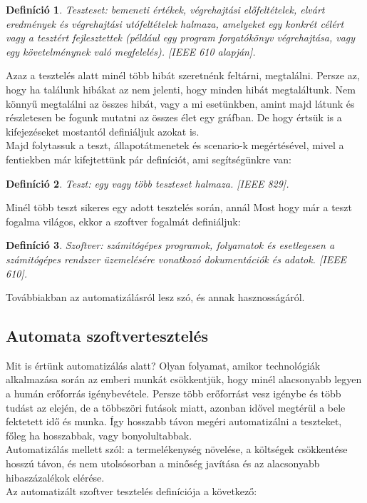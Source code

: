 \documentclass[12pt]{article}
\newtheorem{defin}{Definíció}[section]
\begin{document}
\begin{defin}
Teszteset: bemeneti értékek, végrehajtási előfeltételek, elvárt eredmények és végrehajtási utófeltételek halmaza, amelyeket egy konkrét célért vagy a tesztért fejlesztettek (például egy program forgatókönyv végrehajtása, vagy egy követelménynek való megfelelés). [IEEE 610 alapján]. ~\cite{htb:masterfield}
\end{defin}

Azaz a tesztelés alatt minél több hibát szeretnénk feltárni, megtalálni. Persze az, hogy ha találunk hibákat az nem jelenti, hogy minden hibát megtaláltunk. Nem könnyű megtalálni az összes hibát, vagy a mi esetünkben, amint majd látunk és részletesen be fogunk mutatni az összes élet egy gráfban. De hogy értsük is a kifejezéseket mostantól definiáljuk azokat is.\\

Majd folytassuk a teszt, állapotátmenetek és scenario-k megértésével, mivel a fentiekben már kifejtettünk pár definíciót, ami segítségünkre van:

\begin{defin}
Teszt: egy vagy több teszteset halmaza. [IEEE 829]. ~\cite{htb:masterfield}
\end{defin}

Minél több teszt sikeres egy adott tesztelés során, annál  
Most hogy már a teszt fogalma világos, ekkor a szoftver fogalmát definiáljuk:

\begin{defin}
Szoftver: számitógépes programok, folyamatok és esetlegesen a számitógépes rendszer üzemelésére vonatkozó dokumentációk és adatok. [IEEE 610]. ~\cite{htb:masterfield}
\end{defin}

Továbbiakban az automatizálásról lesz szó, és annak hasznosságáról.\\

\subsection{Automata szoftvertesztelés}

Mit is értünk automatizálás alatt?
Olyan folyamat, amikor technológiák alkalmazása során az emberi munkát csökkentjük, hogy minél alacsonyabb legyen a humán erőforrás igénybevétele. 
Persze több erőforrást vesz igénybe és több tudást az elején, de a többszöri futások miatt, azonban idővel megtérül a bele fektetett idő és munka. Így hosszabb távon megéri automatizálni a teszteket, főleg ha hosszabbak, vagy bonyolultabbak.\\
Automatizálás mellett szól: a termelékenység növelése, a költségek csökkentése hosszú távon, és nem utolsósorban a minőség javítása és az alacsonyabb hibaszázalékok elérése.\\
Az automatizált szoftver tesztelés definíciója a következő:
\end{document}
